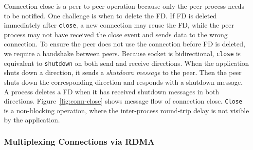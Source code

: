 Connection close is a peer-to-peer operation because only the peer process needs to be notified. One challenge is when to delete the FD. If FD is deleted immediately after \texttt{close}, a new connection may reuse the FD, while the peer process may not have received the close event and sends data to the wrong connection. To ensure the peer does not use the connection before FD is deleted, we require a handshake between peers.
Because socket is bidirectional, \texttt{close} is equivalent to \texttt{shutdown} on both send and receive directions. When the application shuts down a direction, it sends a \textit{shutdown message} to the peer. Then the peer shuts down the corresponding direction and responds with a shutdown message. A process deletes a FD when it has received shutdown messages in both directions. Figure~\ref{fig:conn-close} shows message flow of connection close. \texttt{Close} is a non-blocking operation, where the inter-process round-trip delay is not visible by the application.



\subsubsection{Multiplexing Connections via RDMA}

